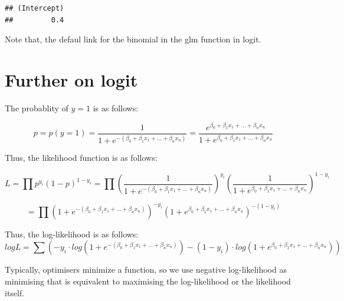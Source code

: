\documentclass[]{book}
\begin{document}
\begin{verbatim}
## (Intercept) 
##         0.4
\end{verbatim}

Note that, the defaul link for the binomial in the glm function in
logit.

\section{Further on logit}\label{further-on-logit}

The probablity of \(y=1\) is as follows:

\[p=p(y=1)=\frac{1}{1+e^{-(\beta_0+\beta_1x_1+...+\beta_nx_n)}}=\frac{e^{\beta_0+\beta_1x_1+...+\beta_nx_n}}{1+e^{\beta_0+\beta_1x_1+...+\beta_nx_n}}\]

Thus, the likelihood function is as follows:

\[L=\prod p^{y_i}(1-p)^{1-y_i}=\prod (\frac{1}{1+e^{-(\beta_0+\beta_1x_1+...+\beta_nx_n)}})^{y_i}(\frac{1}{1+e^{\beta_0+\beta_1x_1+...+\beta_nx_n}})^{1-y_i}\]

\[=\prod (1+e^{-(\beta_0+\beta_1x_1+...+\beta_nx_n)})^{-y_i}(1+e^{\beta_0+\beta_1x_1+...+\beta_nx_n})^{-(1-y_i)}\]

Thus, the log-likelihood is as follows:
\[logL=\sum (-y_i \cdot log(1+e^{-(\beta_0+\beta_1x_1+...+\beta_nx_n)})-(1-y_i)\cdot log(1+e^{\beta_0+\beta_1x_1+...+\beta_nx_n}))\]

Typically, optimisers minimize a function, so we use negative
log-likelihood as minimising that is equivalent to maximising the
log-likelihood or the likelihood itself.
\end{document}
